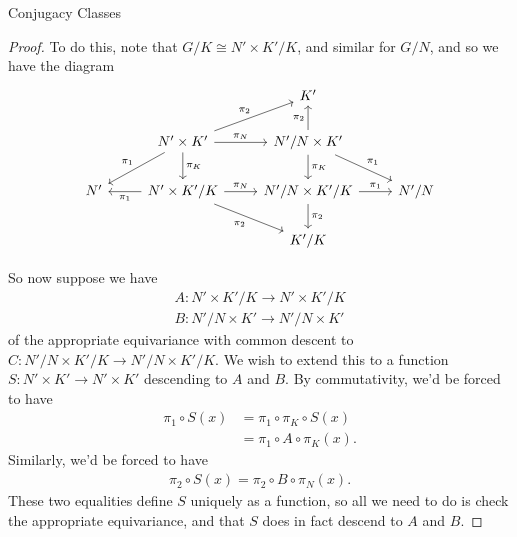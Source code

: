 \documentclass[12nt]{article}
\theoremstyle{plain}
\begin{document}
\begin{subsection}{Conjugacy Classes}
\begin{proof}
To do this, note that $G/K \cong N' \times K'/K$, and similar for $G/N$, and so we have the diagram
\[
\begin{tikzcd}
& & K' \\
& N' \times K' \ar[r, "\pi_N"] \ar[d, "\pi_K"] \ar[ur, "\pi_2"]  \ar[dl, "\pi_1"'] & N'/N \times K' \ar[d, "\pi_K"] \ar[u, "\pi_2"] \ar[dr, "\pi_1"] \\
N' & N' \times K'/K \ar[r, "\pi_N"] \ar[l, "\pi_1"] \ar[dr, "\pi_2"'] & N'/N \times K'/K \ar[r, "\pi_1"] \ar[d, "\pi_2"] & N'/N \\
 & & K'/K
\end{tikzcd}
\]

So now suppose we have 
\begin{align*}
A : N' \times K'/K \to N' \times K'/K \\
B : N'/N \times K' \to N'/N \times K'
\end{align*}
of the appropriate equivariance with common descent to $C : N'/N \times K'/K \to N'/N \times K'/K$. 
We wish to extend this to a function $S : N' \times K' \to N' \times K'$ descending to $A$ and $B$. By commutativity, we'd be forced to have
\begin{align*}
\pi_1 \circ S(x) &= \pi_1 \circ \pi_K \circ S(x) \\
	&= \pi_1 \circ A \circ \pi_K(x).
\end{align*}
Similarly, we'd be forced to have
\begin{align*}
\pi_2 \circ S(x) = \pi_2 \circ B \circ \pi_N(x).
\end{align*}
These two equalities define $S$ uniquely as a function, so all we need to do is check the appropriate equivariance, and that $S$ does in fact descend to $A$ and $B$.


\end{proof}
\end{subsection}
\end{document}
